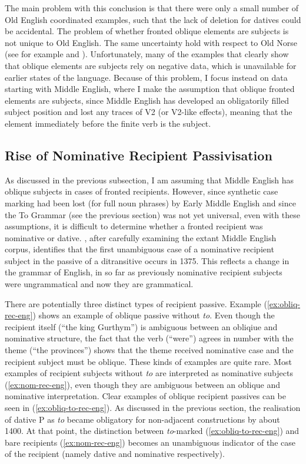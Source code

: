 	The main problem with this conclusion is that there were only a small number of Old English coordinated examples, such that the lack of deletion for datives could be accidental. The problem of whether fronted oblique elements are subjects is not unique to Old English. The same uncertainty hold with respect to Old Norse (see for example \citealt{Kristoffersen.1991,Kristoffersen.1994} and \citealt{Bardal.2001b}). Unfortunately, many of the examples that clearly show that oblique elements are subjects rely on negative data, which is unavailable for earlier states of the language. Because of this problem, I focus instead on data starting with Middle English, where I make the assumption that oblique fronted elements are subjects, since Middle English has developed an obligatorily filled subject position and lost any traces of V2 (or V2-like effects), meaning that the element immediately before the finite verb is the subject.

	\subsection{Rise of Nominative Recipient Passivisation}

	As discussed in the previous subsection, I am assuming that Middle English has oblique subjects in cases of fronted recipients. However, since synthetic case marking had been lost (for full noun phrases) by Early Middle English and since the To Grammar (see the previous section) was not yet universal, even with these assumptions, it is difficult to determine whether a fronted recipient was nominative or dative. \cite{Allen.1999}, after carefully examining the extant Middle English corpus, identifies that the first unambiguous case of a nominative recipient subject in the passive of a ditransitive occurs in 1375. This reflects a change in the grammar of English, in so far as previously nominative recipient subjects were ungrammatical and now they are grammatical.

	There are potentially three distinct types of recipient passive. Example (\ref{ex:obliq-rec-eng}) shows an example of oblique passive without \textit{to}. Even though the recipient itself (``the king Gurthym'') is ambiguous between an obliqiue and nominative structure, the fact that the verb (``were'') agrees in number with the theme (``the provinces'') shows that the theme received nominative case and the recipient subject must be oblique. These kinds of examples are quite rare. Most examples of recipient subjects without \textit{to} are interpreted as nominative subjects (\ref{ex:nom-rec-eng}), even though they are ambiguous between an oblique and nominative interpretation. Clear examples of oblique recipient passives can be seen in (\ref{ex:obliq-to-rec-eng}). As discussed in the previous section, the realisation of dative P as \textit{to} became obligatory for non-adjacent constructions by about 1400. At that point, the distinction between \textit{to}-marked (\ref{ex:obliq-to-rec-eng}) and bare recipients (\ref{ex:nom-rec-eng}) becomes an unambiguous indicator of the case of the recipient (namely dative and nominative respectively).

